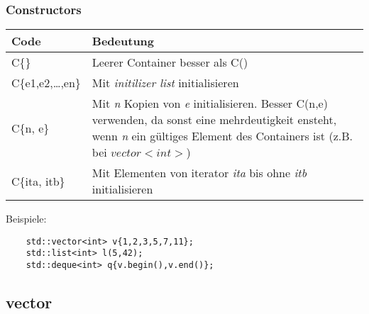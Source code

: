 \subsubsection{Constructors}
	\begin{tabularx}{\columnwidth}{lX}
		Code & Bedeutung \\
		\hline
		C\{\} & Leerer Container besser als C() \\
		C\{e1,e2,\ldots,en\} & Mit \emph{initilizer list} initialisieren \\
		C\{n, e\} & Mit \emph{n} Kopien von \emph{e} initialisieren.  Besser C(n,e) verwenden, da sonst eine mehrdeutigkeit ensteht, wenn \emph{n} ein gültiges Element des Containers ist (z.B. bei $vector<int>$) \\
		C\{ita, itb\} & Mit Elementen von iterator \emph{ita} bis ohne \emph{itb} initialisieren \\
	\end{tabularx}
	Beispiele:
\begin{lstlisting}
	std::vector<int> v{1,2,3,5,7,11};
	std::list<int> l(5,42);
	std::deque<int> q{v.begin(),v.end()};
\end{lstlisting}

\subsection{vector}


